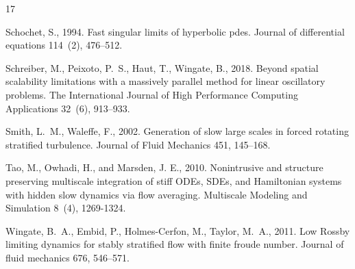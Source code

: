 \documentclass[a4,12pt]{article}
\renewenvironment{thebibliography}[1]{%
    \begin{oldthebibliography}{#1}%
    \setlength{\parskip}{0ex}%
    \setlength{\itemsep}{0ex}%
}%
                 {%
  \end{oldthebibliography}%
                 }
\begin{document}
\begin{thebibliography}{17}
Schochet, S., 1994. Fast singular limits of hyperbolic pdes. Journal of
  differential equations 114~(2), 476--512.

Schreiber, M., Peixoto, P.~S., Haut, T., Wingate, B., 2018. Beyond spatial
  scalability limitations with a massively parallel method for linear
  oscillatory problems. The International Journal of High Performance Computing
  Applications 32~(6), 913--933.

Smith, L.~M., Waleffe, F., 2002. Generation of slow large scales in forced
  rotating stratified turbulence. Journal of Fluid Mechanics 451, 145--168.

Tao, M., Owhadi, H., and Marsden, J. E., 2010. Nonintrusive and structure preserving multiscale integration of stiff ODEs, SDEs, and Hamiltonian systems with hidden slow dynamics via flow averaging. Multiscale Modeling and Simulation 8~(4), 1269-1324.

Wingate, B.~A., Embid, P., Holmes-Cerfon, M., Taylor, M.~A., 2011. Low {R}ossby
  limiting dynamics for stably stratified flow with finite froude number.
  Journal of fluid mechanics 676, 546--571.

\end{thebibliography}
\end{document}
